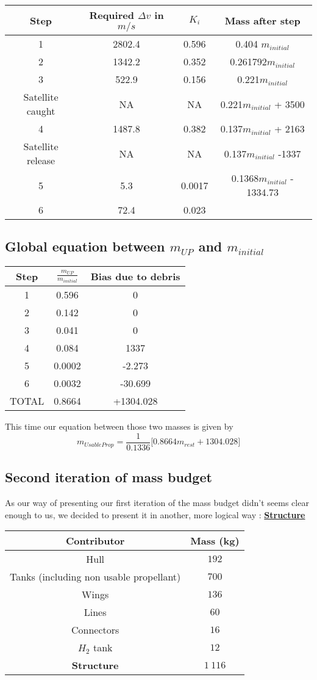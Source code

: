 \begin{longtable}[]{@{}cccc@{}}
\toprule
Step & Required \(\Delta v\) in \(m/s\) & \(K_i\) & Mass after
step\tabularnewline
\midrule
\endhead
1 & 2802.4 & 0.596 & 0.404 \(m_{initial}\)\tabularnewline
2 & 1342.2 & 0.352 & 0.261792\(m_{initial}\)\tabularnewline
3 & 522.9 & 0.156 & 0.221\(m_{initial}\)\tabularnewline
Satellite caught & NA & NA & 0.221\(m_{initial}\) + 3500\tabularnewline
4 & 1487.8 & 0.382 & 0.137\(m_{initial}\) + 2163\tabularnewline
Satellite release & NA & NA & 0.137\(m_{initial}\) -1337\tabularnewline
5 & 5.3 & 0.0017 & 0.1368\(m_{initial}\) - 1334.73\tabularnewline
6 & 72.4 & 0.023 &\tabularnewline
\bottomrule
\end{longtable}


\subsection{\texorpdfstring{Global equation between \(m_{UP}\) and
		\(m_{initial}\)}{Global equation between m\_\{UP\} and m\_\{initial\}}}
\begin{longtable}[]{@{}ccc@{}}
\toprule
Step & \(\frac{m_{UP}}{m_{initial}}\) & Bias due to
debris\tabularnewline
\midrule
\endhead
1 & 0.596 & 0\tabularnewline
2 & 0.142 & 0\tabularnewline
3 & 0.041 & 0\tabularnewline
4 & 0.084 & 1337\tabularnewline
5 & 0.0002 & -2.273\tabularnewline
6 & 0.0032 & -30.699\tabularnewline
TOTAL & 0.8664 & +1304.028\tabularnewline
\bottomrule
\end{longtable}



This time our equation between those two masses is given by 
\begin{equation}
m_{UsableProp} = \frac 1{0.1336}\bigg[0.8664 m_{rest} + 1304.028\bigg]
\end{equation}

\subsection{Second iteration of mass budget}

\qquad As our way of presenting our first iteration of the mass budget didn't seems clear enough to us, we decided to present it in another, more logical way :
\textbf{\underline{Structure}}
\begin{center}
\begin{tabular}[H]{|c|c|}
	\hline
	\cellcolor{gray!50}Contributor & \cellcolor{gray!50}Mass (kg)\\
	\hline
	Hull & $192$\\
	\hline
	Tanks (including non usable propellant) & $700$\\
	\hline
	Wings & $136$\\
	\hline
	Lines & $60$\\
	\hline
	Connectors & $16$\\
	\hline
	$H_2$ tank & $12$\\
	\hline
	\cellcolor{green!30}\textbf{Structure} & \textbf{$1\ 116$}\\
	\hline
\end{tabular}
\end{center}

